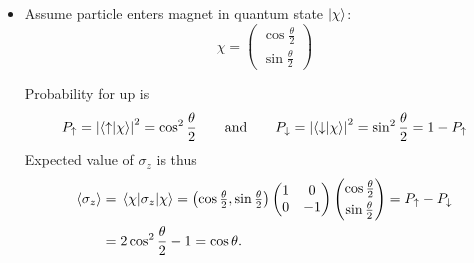 \documentclass[11pt, a4paper]{article}
\newcommand{\ua}{\uparrow}  %
\newcommand{\da}{\downarrow}  %
\begin{document}
\begin{itemize}
    \item Assume particle enters magnet in quantum state $ \ket{\chi} $:
    \begin{equation*}
        \chi = 
        \begin{pmatrix}
            \cos \frac{\theta}{2}\\
            \sin \frac{\theta}{2}
        \end{pmatrix}
    \end{equation*}
    
    Probability for up is 
    \begin{equation*}
        P_{\ua} = \abs{\braket{\ua}{\chi}}^{2} = \cos^{2}\frac{\theta}{2} \qquad \text{and} \qquad P_{\da} = \abs{\braket{\da}{\chi}}^{2} = \sin^{2} \frac{\theta}{2} = 1 - P_{\ua}
    \end{equation*}
    Expected value of $ \sigma_{z} $ is thus
    \begin{align*}
        \ev{\sigma_{z}} &= \mel{\chi}{\sigma_{z}}{\chi} = 
        \left( \cos \tfrac{\theta}{2}, \sin \tfrac{\theta}{2} \right) 
        \begin{pmatrix}
            1 & 0\\
            0 & -1
        \end{pmatrix}
        \begin{pmatrix}
            \cos \frac{\theta}{2}\\[1mm]
            \sin \frac{\theta}{2}
        \end{pmatrix}
        = P_{\ua} - P_{\da}\\
        & = 2 \cos^{2} \frac{\theta}{2} - 1 = \cos \theta.
    \end{align*}
    
    
\end{itemize}
\end{document}
